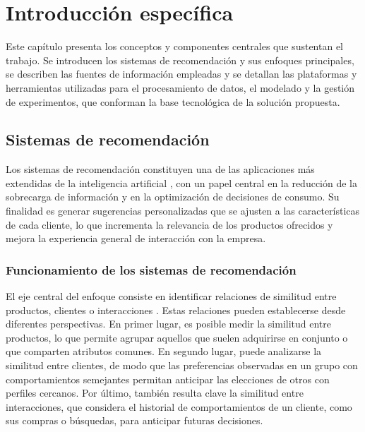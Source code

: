 \chapter{Introducción específica} 

\label{Chapter2}

Este capítulo presenta los conceptos y componentes centrales que sustentan el trabajo. Se introducen los sistemas de recomendación y sus enfoques principales, se describen las fuentes de información empleadas y se detallan las plataformas y herramientas utilizadas para el procesamiento de datos, el modelado y la gestión de experimentos, que conforman la base tecnológica de la solución propuesta.

\section{Sistemas de recomendación}

Los sistemas de recomendación constituyen una de las aplicaciones más extendidas de la inteligencia artificial \cite{BOOK:Ricci2015,ARTICLE:Adomavicius2005}, con un papel central en la reducción de la sobrecarga de información y en la optimización de decisiones de consumo. Su finalidad es generar sugerencias personalizadas que se ajusten a las características de cada cliente, lo que incrementa la relevancia de los productos ofrecidos y mejora la experiencia general de interacción con la empresa.

\subsection{Funcionamiento de los sistemas de recomendación}

El eje central del enfoque consiste en identificar relaciones de similitud entre productos, clientes o interacciones \cite{BOOK:Ricci2015}. Estas relaciones pueden establecerse desde diferentes perspectivas. En primer lugar, es posible medir la similitud entre productos, lo que permite agrupar aquellos que suelen adquirirse en conjunto o que comparten atributos comunes. En segundo lugar, puede analizarse la similitud entre clientes, de modo que las preferencias observadas en un grupo con comportamientos semejantes permitan anticipar las elecciones de otros con perfiles cercanos. Por último, también resulta clave la similitud entre interacciones, que considera el historial de comportamientos de un cliente, como sus compras o búsquedas, para anticipar futuras decisiones.

